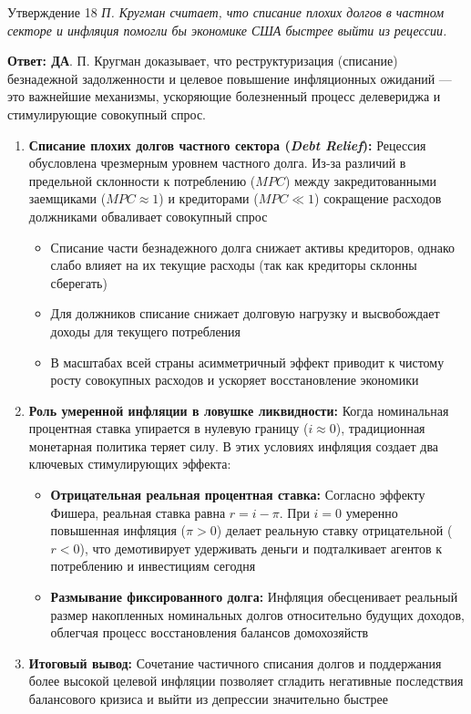 \documentclass[10pt,a4paper]{article}
\newcommand{\qda}{\textbf{\color{yesgreen}Ответ: ДА}}
\newenvironment{answer}[2]{%
  \begin{qbox}{Утверждение #1}
  \textit{#2}\par\smallskip
}{%
  \end{qbox}\vspace{2pt}
}
\begin{document}
\begin{answer}{18}{П. Кругман считает, что списание плохих долгов в частном секторе и инфляция помогли бы экономике США быстрее выйти из рецессии.}
\qda. П. Кругман доказывает, что реструктуризация (списание) безнадежной задолженности и целевое повышение инфляционных ожиданий — это важнейшие механизмы, ускоряющие болезненный процесс делевериджа и стимулирующие совокупный спрос.

\begin{enumerate}
    \item \textbf{Списание плохих долгов частного сектора (\textit{Debt Relief}):}
    Рецессия обусловлена чрезмерным уровнем частного долга. Из-за различий в предельной склонности к потреблению ($MPC$) между закредитованными заемщиками ($MPC \approx 1$) и кредиторами ($MPC \ll 1$) сокращение расходов должниками обваливает совокупный спрос
    \begin{itemize}
        \item Списание части безнадежного долга снижает активы кредиторов, однако слабо влияет на их текущие расходы (так как кредиторы склонны сберегать)
        \item Для должников списание снижает долговую нагрузку и высвобождает доходы для текущего потребления
        \item В масштабах всей страны асимметричный эффект приводит к чистому росту совокупных расходов и ускоряет восстановление экономики
    \end{itemize}

    \item \textbf{Роль умеренной инфляции в ловушке ликвидности:}
    Когда номинальная процентная ставка упирается в нулевую границу ($i \approx 0$), традиционная монетарная политика теряет силу. В этих условиях инфляция создает два ключевых стимулирующих эффекта:
    \begin{itemize}
        \item \textbf{Отрицательная реальная процентная ставка:} Согласно эффекту Фишера, реальная ставка равна $r = i - \pi$. При $i = 0$ умеренно повышенная инфляция ($\pi > 0$) делает реальную ставку отрицательной ($r < 0$), что демотивирует удерживать деньги и подталкивает агентов к потреблению и инвестициям сегодня
        \item \textbf{Размывание фиксированного долга:} Инфляция обесценивает реальный размер накопленных номинальных долгов относительно будущих доходов, облегчая процесс восстановления балансов домохозяйств
    \end{itemize}

    \item \textbf{Итоговый вывод:}
    Сочетание частичного списания долгов и поддержания более высокой целевой инфляции позволяет сгладить негативные последствия балансового кризиса и выйти из депрессии значительно быстрее
\end{enumerate}
\end{answer}
\end{document}
